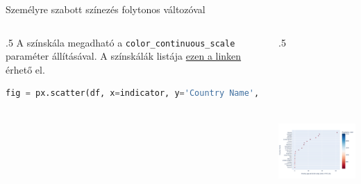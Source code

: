 \documentclass[english, aspectratio=169]{beamer}
\begin{document}
\begin{frame}[fragile]{Személyre szabott színezés folytonos változóval}
	\begin{columns}
		\begin{column}{.5\textwidth}
			A színskála megadható a \texttt{color\_continuous\_scale} paraméter állításával. A színskálák listája \href{https://plotly.com/python/builtin-colorscales/}{ezen a linken} érhető el.\par\medskip
			\begin{lstlisting}[language=python]
fig = px.scatter(df, x=indicator, y='Country Name', color='Population, total', color_continuous_scale='RdBu')				
			\end{lstlisting}
		\end{column}
		\begin{column}{.5\textwidth}
			\begin{center}
				\includegraphics[width=7cm, height=7cm, keepaspectratio]{images/scatter_10.png}
			\end{center}
		\end{column}
	\end{columns}
\end{frame}
\end{document}
